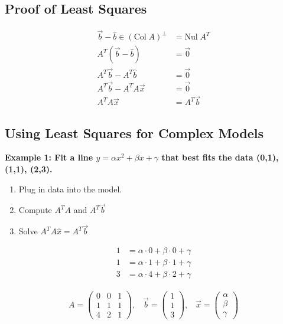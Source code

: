 \subsection{Proof of Least Squares}
\begin{align}
    \Vec{b} - \hat{b} \in (\text{Col}\; A)^\perp &= \text{Nul} \; A^T \\
    A^T (\Vec{b} - \hat{b}) &= \Vec{0} \\
    A^T \Vec{b} - A^T \hat{b} &= \Vec{0} \\
    A^T \Vec{b} - A^T A \Vec{x} &= \Vec{0} \\
    A^T A \Vec{x} &= A^T \Vec{b}
\end{align}

\subsection{Using Least Squares for Complex Models}
\textbf{Example 1: Fit a line \(y=\alpha x^2+\beta x + \gamma\) that best fits the data (0,1), (1,1), (2,3).}

\begin{enumerate}
    \item Plug in data into the model.
    \item Compute \(A^T A\) and \(A^T \Vec{b}\)
    \item Solve \(A^T A \hat{x}=A^T \Vec{b}\)
\end{enumerate}

\begin{align}
    1 &= \alpha \cdot 0 + \beta \cdot 0 + \gamma \\
    1 &= \alpha \cdot 1 + \beta \cdot 1 + \gamma \\
    3 &= \alpha \cdot 4 + \beta \cdot 2 + \gamma
\end{align}

\begin{align}
    A = \begin{pmatrix}
        0 & 0 & 1 \\ 1 & 1 & 1 \\ 4 & 2 & 1
    \end{pmatrix}, \; \; \;
    \Vec{b} = \begin{pmatrix}
        1 \\ 1 \\ 3
    \end{pmatrix}, \; \; \;
    \Vec{x} = \begin{pmatrix}
        \alpha \\ \beta \\ \gamma
    \end{pmatrix}
\end{align}

